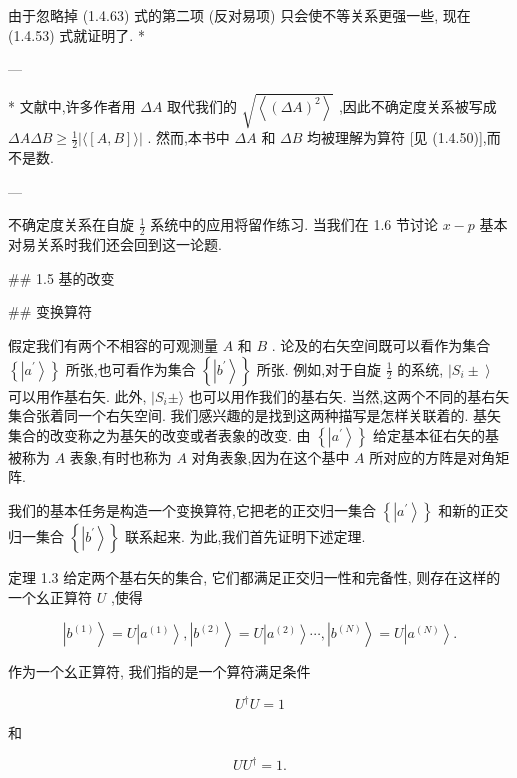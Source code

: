 \documentclass[lang=cn,newtx,10pt,scheme=chinese,thmcnt=section]{elegantbook}
\begin{document}
由于忽略掉 (1.4.63) 式的第二项 (反对易项) 只会使不等关系更强一些, 现在 (1.4.53) 式就证明了. *

---

* 文献中,许多作者用 ${\Delta A}$ 取代我们的 $\sqrt{\left\langle {\left( \Delta A\right) }^{2}\right\rangle }$ ,因此不确定度关系被写成 ${\Delta A\Delta B} \geq \frac{1}{2}\left| {\langle \left\lbrack {A, B}\right\rbrack \rangle }\right|$ . 然而,本书中 ${\Delta A}$ 和 ${\Delta B}$ 均被理解为算符 [见 (1.4.50)],而不是数.

---

不确定度关系在自旋 $\frac{1}{2}$ 系统中的应用将留作练习. 当我们在 1.6 节讨论 $x - p$ 基本对易关系时我们还会回到这一论题.



## 1.5 基的改变

## 变换算符

假定我们有两个不相容的可观测量 $A$ 和 $B$ . 论及的右矢空间既可以看作为集合 $\left\{ \left| {a}^{\prime }\right\rangle \right\}$ 所张,也可看作为集合 $\left\{ \left| {b}^{\prime }\right\rangle \right\}$ 所张. 例如,对于自旋 $\frac{1}{2}$ 的系统, $\left| {{S}_{i} \pm }\right\rangle$ 可以用作基右矢. 此外, $\mid {S}_{i} \pm \rangle$ 也可以用作我们的基右矢. 当然,这两个不同的基右矢集合张着同一个右矢空间. 我们感兴趣的是找到这两种描写是怎样关联着的. 基矢集合的改变称之为基矢的改变或者表象的改变. 由 $\left\{ \left| {a}^{\prime }\right\rangle \right\}$ 给定基本征右矢的基被称为 $A$ 表象,有时也称为 $A$ 对角表象,因为在这个基中 $A$ 所对应的方阵是对角矩阵.

我们的基本任务是构造一个变换算符,它把老的正交归一集合 $\left\{ \left| {a}^{\prime }\right\rangle \right\}$ 和新的正交归一集合 $\left\{ \left| {b}^{\prime }\right\rangle \right\}$ 联系起来. 为此,我们首先证明下述定理.

定理 1.3 给定两个基右矢的集合, 它们都满足正交归一性和完备性, 则存在这样的一个幺正算符 $U$ ,使得

$$
\left| {b}^{\left( 1\right) }\right\rangle = U\left| {a}^{\left( 1\right) }\right\rangle ,\left| {b}^{\left( 2\right) }\right\rangle = U\left| {a}^{\left( 2\right) }\right\rangle \cdots ,\left| {b}^{\left( N\right) }\right\rangle = U\left| {a}^{\left( N\right) }\right\rangle . \tag{1.5.1}
$$

作为一个幺正算符, 我们指的是一个算符满足条件

$$
{U}^{ \dagger }U = 1 \tag{1.5.2}
$$

和

$$
U{U}^{ \dagger } = 1\text{.} \tag{1.5.3}
$$
\end{document}
